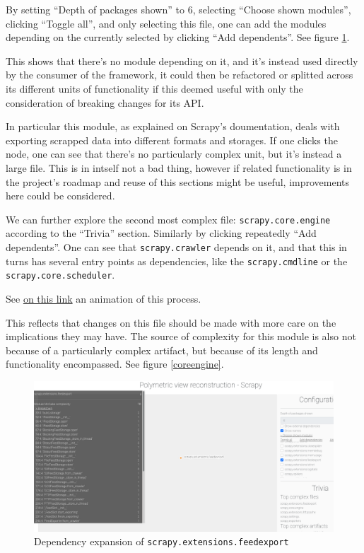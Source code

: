 \documentclass[a4paper,11pt]{article}
\begin{document}
By setting ``Depth of packages shown'' to 6, selecting ``Choose shown modules'', clicking ``Toggle all'', and only selecting this file, one can add the modules depending on the currently selected by clicking ``Add dependents''. See figure \ref{feedexport}.

This shows that there's no module depending on it, and it's instead used directly by the consumer of the framework, it could then be refactored or splitted across its different units of functionality if this deemed useful with only the consideration of breaking changes for its API.

In particular this module, as explained on Scrapy's doumentation, deals with exporting scrapped data into different formats and storages. If one clicks the node, one can see that there's no particularly complex unit, but it's instead a large file. This is in intself not a bad thing, however if related functionality is in the project's roadmap and reuse of this sections might be useful, improvements here could be considered.

We can further explore the second most complex file: \texttt{scrapy.core.engine} according to the ``Trivia'' section. Similarly by clicking repeatedly ``Add dependents''. One can see that \texttt{scrapy.crawler} depends on it, and that this in turns has several entry points as dependencies, like the \texttt{scrapy.cmdline} or the \texttt{scrapy.core.scheduler}.

See \href{https://github.com/mynjj/architecture-reconstruction/tree/main/screenshots/getting-deps.gif}{on this link} an animation of this process.

This reflects that changes on this file should be made with more care on the implications they may have. The source of complexity for this module is also not because of a particularly complex artifact, but because of its length and functionality encompassed. See figure \ref{coreengine}.

\begin{figure}
\includegraphics[width=.9\linewidth]{../screenshots/feedexport.png}
\caption{Dependency expansion of \texttt{scrapy.extensions.feedexport}}
\label{feedexport}
\end{figure}
\end{document}
